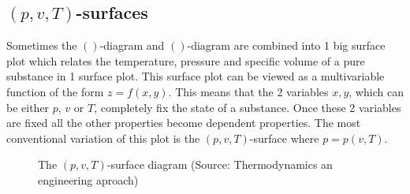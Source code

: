 \documentclass[11pt, a4paper]{article}
\begin{document}
\subsection{$(p,v,T)$-surfaces}
Sometimes the $()$-diagram and $()$-diagram are combined into 1 big surface plot which relates the temperature, pressure and specific volume of a pure substance in 1 surface plot. This surface plot can be viewed as a multivariable function of the form $z=f(x, y)$. This means that the 2 variables $x, y$, which can be either $p$, $v$ or $T$, completely fix the state of a substance. Once these 2 variables are fixed all the other properties become dependent properties. The most conventional variation of this plot is the $(p, v, T)$-surface where $p = p(v, T)$.
\begin{figure}[h]
  \centering
  \qquad \qquad \qquad 
  \caption{The $(p, v, T)$-surface diagram (Source: Thermodynamics an engineering aproach)}
\end{figure}
\end{document}
